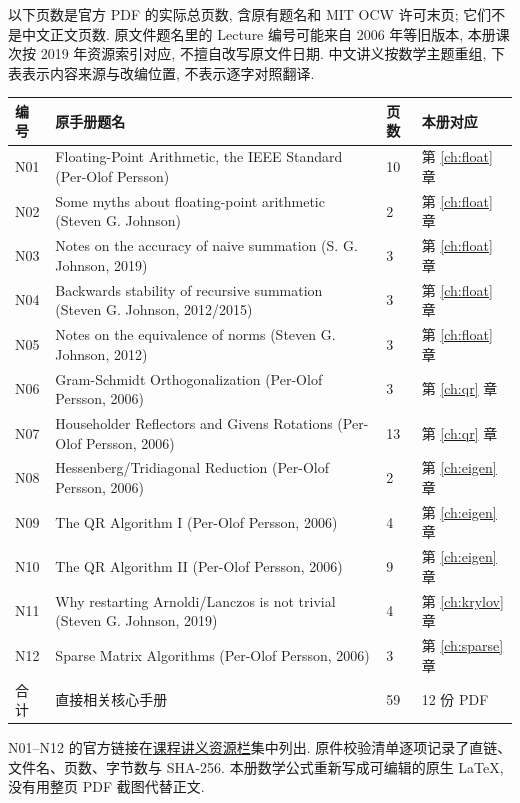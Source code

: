 \appendix
{}\label{app:sources}
以下页数是官方 PDF 的实际总页数, 含原有题名和 MIT OCW 许可末页; 它们不是中文正文页数. 原文件题名里的 Lecture 编号可能来自 2006 年等旧版本, 本册课次按 2019 年资源索引对应, 不擅自改写原文件日期. 中文讲义按数学主题重组, 下表表示内容来源与改编位置, 不表示逐字对照翻译.

\begin{longtable}{p{.8cm}p{8.2cm}p{.8cm}p{3cm}}
\toprule
编号 & 原手册题名 & 页数 & 本册对应\\
\midrule
\endhead
N01 & Floating-Point Arithmetic, the IEEE Standard (Per-Olof Persson) & 10 & 第 \ref{ch:float} 章\\
N02 & Some myths about floating-point arithmetic (Steven G. Johnson) & 2 & 第 \ref{ch:float} 章\\
N03 & Notes on the accuracy of naive summation (S. G. Johnson, 2019) & 3 & 第 \ref{ch:float} 章\\
N04 & Backwards stability of recursive summation (Steven G. Johnson, 2012/2015) & 3 & 第 \ref{ch:float} 章\\
N05 & Notes on the equivalence of norms (Steven G. Johnson, 2012) & 3 & 第 \ref{ch:float} 章\\
N06 & Gram-Schmidt Orthogonalization (Per-Olof Persson, 2006) & 3 & 第 \ref{ch:qr} 章\\
N07 & Householder Reflectors and Givens Rotations (Per-Olof Persson, 2006) & 13 & 第 \ref{ch:qr} 章\\
N08 & Hessenberg/Tridiagonal Reduction (Per-Olof Persson, 2006) & 2 & 第 \ref{ch:eigen} 章\\
N09 & The QR Algorithm I (Per-Olof Persson, 2006) & 4 & 第 \ref{ch:eigen} 章\\
N10 & The QR Algorithm II (Per-Olof Persson, 2006) & 9 & 第 \ref{ch:eigen} 章\\
N11 & Why restarting Arnoldi/Lanczos is not trivial (Steven G. Johnson, 2019) & 4 & 第 \ref{ch:krylov} 章\\
N12 & Sparse Matrix Algorithms (Per-Olof Persson, 2006) & 3 & 第 \ref{ch:sparse} 章\\
\midrule
合计 & 直接相关核心手册 & 59 & 12 份 PDF\\
\bottomrule
\end{longtable}
N01--N12 的官方链接在\href{https://ocw.mit.edu/courses/18-335j-introduction-to-numerical-methods-spring-2019/resources/lecture-notes/}{课程讲义资源栏}集中列出. 原件校验清单逐项记录了直链、文件名、页数、字节数与 SHA-256. 本册数学公式重新写成可编辑的原生 LaTeX, 没有用整页 PDF 截图代替正文.

